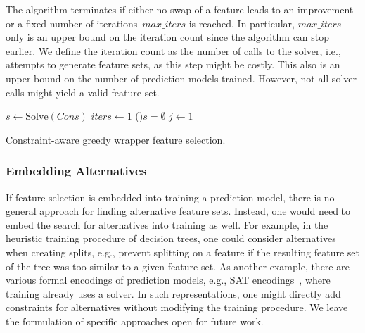 \documentclass{article}
\theoremstyle{definition}
\begin{document}
The algorithm terminates if either no swap of a feature leads to an improvement or a fixed number of iterations~$max\_iters$ is reached.
In particular, $max\_iters$ only is an upper bound on the iteration count since the algorithm can stop earlier.
We define the iteration count as the number of calls to the solver, i.e., attempts to generate feature sets, as this step might be costly.
This also is an upper bound on the number of prediction models trained.
However, not all solver calls might yield a valid feature set.

\begin{algorithm}[htb]
	\DontPrintSemicolon
	\BlankLine
	$s \leftarrow \text{Solve}(Cons)$ 
	$iters \leftarrow 1$ 
	\If(){$s = \emptyset$}{
		\Return{$\emptyset$}
	}
	$j \leftarrow 1$ 
	\caption{Constraint-aware greedy wrapper feature selection.}
	\label{al:afs:greedy-wrapper}
\end{algorithm}

\subsubsection{Embedding Alternatives}
\label{sec:afs:approach:objectives:embedding}

If feature selection is embedded into training a prediction model, there is no general approach for finding alternative feature sets.
Instead, one would need to embed the search for alternatives into training as well.
For example, in the heuristic training procedure of decision trees, one could consider alternatives when creating splits, e.g., prevent splitting on a feature if the resulting feature set of the tree was too similar to a given feature set.
As another example, there are various formal encodings of prediction models, e.g., SAT encodings~\cite{narodytska2018learning, schidler2021sat, yu2021learning}, where training already uses a solver.
In such representations, one might directly add constraints for alternatives without modifying the training procedure.
We leave the formulation of specific approaches open for future work.
\end{document}
